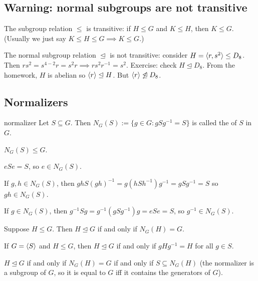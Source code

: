 \documentclass[12pt,letterpaper]{report}
\begin{document}
\pagebreak
\subsection{Warning: normal subgroups are not transitive}

The subgroup relation $\leq$ is transitive: if $H \leq G$ and $K \leq H$, then $K \leq G$.
(Usually we just say $K \leq H \leq G \implies K \leq G$.)

The normal subgroup relation $\trianglelefteq$ is not transitive: consider
$H = \langle r, s^2\rangle \leq D_8$.
Then $rs^2 = s^{4 - 2}r = s^2 r \implies rs^2r^{-1} = s^2$.
Exercise: check $H \trianglelefteq D_8$.
From the homework, $H$ is abelian so $\langle r\rangle \trianglelefteq H$.
But $\langle r\rangle \not\trianglelefteq D_8$.

\pagebreak
\subsection{Normalizers}

\begin{defn}{normalizer}{}
  Let $S \subseteq G$.
  Then $N_G(S) := \{g \in G : gSg^{-1} = S\}$ is called the  of $S$ in $G$.
\end{defn}

\begin{lem}{}{}
  $N_G(S) \leq G$.
\end{lem}

\begin{thmproof}
  $eSe = S$, so $e \in N_G(S)$.

  If $g, h \in N_G(S)$, then $ghS(gh)^{-1} = g(hSh^{-1})g^{-1} = gSg^{-1} = S$ so $gh \in N_G(S)$.

  If $g \in N_G(S)$, then $g^{-1}Sg = g^{-1}(gSg^{-1})g = eSe = S$, so $g^{-1} \in N_G(S)$.
\end{thmproof}

\begin{lem}{}{}
  Suppose $H \leq G$.
  Then $H \trianglelefteq G$ if and only if $N_G(H) = G$.
\end{lem}

\begin{cor}{}{}
  If $G = \langle S\rangle$ and $H \leq G$, then $H \trianglelefteq G$ if and only if $gHg^{-1} = H$ for all
  $g \in S$.
\end{cor}

\begin{thmproof}
  $H \trianglelefteq G$ if and only if $N_G(H) = G$ if and only if $S \subseteq N_G(H)$ (the
  normalizer is a subgroup of $G$, so it is equal to $G$ iff it contains the generators of $G$).
\end{thmproof}
\end{document}
